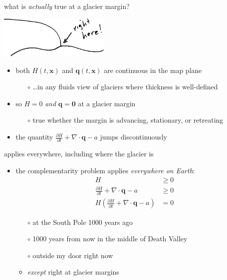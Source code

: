 \documentclass[10pt,hyperref,dvipsnames]{beamer}
\newcommand{\bq}{\mathbf{q}}
\newcommand{\bx}{\mathbf{x}}
\newcommand{\bzero}{\bm{0}}
\newcommand{\Div}{\nabla\cdot}
\begin{document}
\begin{frame}{what is \emph{actually} true at a glacier margin?}

\begin{center}
\includegraphics[width=0.4\textwidth]{figs/margin.png}
\end{center}

\bigskip
\begin{itemize}
\item \alert{both $H(t,\bx)$ and $\bq(t,\bx)$ are continuous in the map plane}
    \begin{itemize}
    \item[$\circ$] \dots in any fluids view of glaciers where thickness is well-defined
    \end{itemize}

\medskip
\item so $H=0$ \emph{and} $\bq=\bzero$ at a glacier margin
    \begin{itemize}
    \item[$\circ$] true whether the margin is advancing, stationary, or retreating
    \end{itemize}

\medskip
\item the quantity \quad $\frac{\partial H}{\partial t} + \Div \bq - a$ \quad jumps discontinuously
\end{itemize}
\end{frame}


\begin{frame}{applies everywhere, including where the glacier is}
\begin{itemize}
\item the complementarity problem applies \emph{everywhere on Earth}:
\begin{align*}
H &\ge 0 \\
\frac{\partial H}{\partial t} + \Div \bq - a &\ge 0 \\
H \left(\frac{\partial H}{\partial t} + \Div \bq - a\right) &= 0
\end{align*}
    \begin{itemize}
    \item[$\circ$] at the South Pole 1000 years ago
    \item[$\circ$] 1000 years from now in the middle of Death Valley
    \item[$\circ$] outside my door right now

    \medskip
    \item<2>[$\circ$] \emph{except} right at glacier margins
    \end{itemize}
\end{itemize}
\end{frame}
\end{document}
